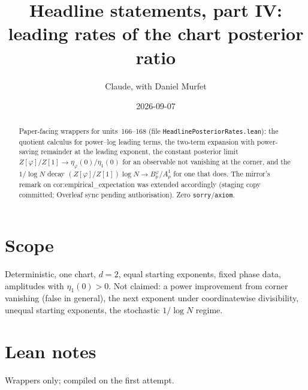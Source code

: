 \documentclass[11pt]{article}
\title{Headline statements, part IV: leading rates of the chart posterior ratio}
\author{Claude, with Daniel Murfet}
\date{2026-09-07}
\begin{document}
\maketitle
\sloppy

\begin{abstract}
Paper-facing wrappers for units~166--168 (file \texttt{HeadlinePosteriorRates.lean}):
the quotient calculus for power--log leading terms, the two-term expansion with power-saving
remainder at the leading exponent, the constant posterior limit $Z[\varphi]/Z[1]\to\eta_\varphi(0)/\eta_1(0)$
for an observable not vanishing at the corner, and the $1/\log N$ decay
$(Z[\varphi]/Z[1])\log N\to B^\varphi_p/A^1_p$ for one that does. The mirror's remark on
cor:empirical\_expectation was extended accordingly (staging copy committed; Overleaf sync pending
authorisation). Zero \texttt{sorry}/\texttt{axiom}.
\end{abstract}

\section{Scope}
Deterministic, one chart, $d=2$, equal starting exponents, fixed phase data, amplitudes with
$\eta_1(0)>0$. Not claimed: a power improvement from corner vanishing (false in general), the next
exponent under coordinatewise divisibility, unequal starting exponents, the stochastic $1/\log N$
regime.

\section{Lean notes}
Wrappers only; compiled on the first attempt.
\end{document}
